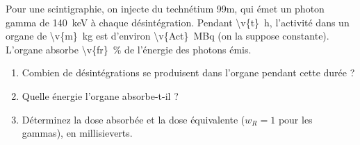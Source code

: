 Pour une scintigraphie, on injecte du technétium 99m, qui émet un photon gamma de \qty{140}{keV} à chaque désintégration. Pendant \qty{\v{t}}{h}, l'activité dans un organe de \qty{\v{m}}{kg} est d'environ \qty{\v{Act}}{MBq} (on la suppose constante). L'organe absorbe \qty{\v{fr}}{\percent} de l'énergie des photons émis.

\begin{enumerate}[label=\alph*)]
    \item Combien de désintégrations se produisent dans l'organe pendant cette durée ?
    \item Quelle énergie l'organe absorbe-t-il ?
    \item Déterminez la dose absorbée et la dose équivalente ($w_R = 1$ pour les gammas), en millisieverts.
\end{enumerate}
